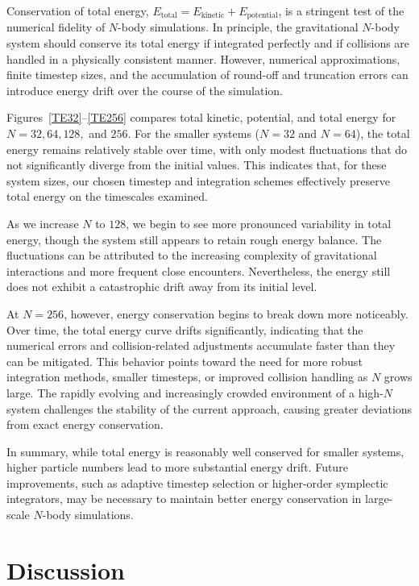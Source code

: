 \documentclass[a4paper, 12pt, oneside, onecolumn]{article}
\begin{document}
\begin{multicols}{2}

Conservation of total energy, $E_{\text{total}} = E_{\text{kinetic}} + E_{\text{potential}}$, is a stringent test of the numerical fidelity of $N$-body simulations. In principle, the gravitational $N$-body system should conserve its total energy if integrated perfectly and if collisions are handled in a physically consistent manner. However, numerical approximations, finite timestep sizes, and the accumulation of round-off and truncation errors can introduce energy drift over the course of the simulation.

Figures~\ref{TE32}--\ref{TE256} compares total kinetic, potential, and total energy for $N = 32, 64, 128,$ and $256$. For the smaller systems ($N = 32$ and $N = 64$), the total energy remains relatively stable over time, with only modest fluctuations that do not significantly diverge from the initial values. This indicates that, for these system sizes, our chosen timestep and integration schemes effectively preserve total energy on the timescales examined.

As we increase $N$ to $128$, we begin to see more pronounced variability in total energy, though the system still appears to retain rough energy balance. The fluctuations can be attributed to the increasing complexity of gravitational interactions and more frequent close encounters. Nevertheless, the energy still does not exhibit a catastrophic drift away from its initial level.

At $N = 256$, however, energy conservation begins to break down more noticeably. Over time, the total energy curve drifts significantly, indicating that the numerical errors and collision-related adjustments accumulate faster than they can be mitigated. This behavior points toward the need for more robust integration methods, smaller timesteps, or improved collision handling as $N$ grows large. The rapidly evolving and increasingly crowded environment of a high-$N$ system challenges the stability of the current approach, causing greater deviations from exact energy conservation.

In summary, while total energy is reasonably well conserved for smaller systems, higher particle numbers lead to more substantial energy drift. Future improvements, such as adaptive timestep selection or higher-order symplectic integrators, may be necessary to maintain better energy conservation in large-scale $N$-body simulations.





\section{Discussion}








\end{multicols}
\end{document}
